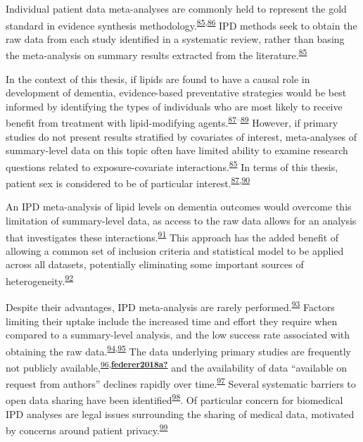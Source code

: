 \documentclass[a4paper, twoside]{templates/ociamthesis}
\begin{document}
Individual patient data meta-analyses are commonly held to represent the gold standard in evidence synthesis methodology.\textsuperscript{\protect\hyperlink{ref-riley2010}{85},\protect\hyperlink{ref-stewart1993}{86}} IPD methods seek to obtain the raw data from each study identified in a systematic review, rather than basing the meta-analysis on summary results extracted from the literature.\textsuperscript{\protect\hyperlink{ref-riley2010}{85}}

In the context of this thesis, if lipids are found to have a causal role in development of dementia, evidence-based preventative strategies would be best informed by identifying the types of individuals who are most likely to receive benefit from treatment with lipid-modifying agents.\textsuperscript{\protect\hyperlink{ref-arain2009}{87}--\protect\hyperlink{ref-mccartney2016}{89}} However, if primary studies do not present results stratified by covariates of interest, meta-analyses of summary-level data on this topic often have limited ability to examine research questions related to exposure-covariate interactions.\textsuperscript{\protect\hyperlink{ref-riley2010}{85}} In terms of this thesis, patient sex is considered to be of particular interest.\textsuperscript{\protect\hyperlink{ref-arain2009}{87},\protect\hyperlink{ref-letenneur1999}{90}}

An IPD meta-analysis of lipid levels on dementia outcomes would overcome this limitation of summary-level data, as access to the raw data allows for an analysis that investigates these interactions.\textsuperscript{\protect\hyperlink{ref-riley2020}{91}} This approach has the added benefit of allowing a common set of inclusion criteria and statistical model to be applied across all datasets, potentially eliminating some important sources of heterogeneity.\textsuperscript{\protect\hyperlink{ref-stewart2002}{92}}

Despite their advantages, IPD meta-analysis are rarely performed.\textsuperscript{\protect\hyperlink{ref-tugwell2010}{93}} Factors limiting their uptake include the increased time and effort they require when compared to a summary-level analysis, and the low success rate associated with obtaining the raw data.\textsuperscript{\protect\hyperlink{ref-nevitt2017a}{94},\protect\hyperlink{ref-ventresca2020}{95}} The data underlying primary studies are frequently not publicly available,\textsuperscript{\protect\hyperlink{ref-alsheikh-ali2011}{96},\protect\hyperlink{ref-federer2018a}{\textbf{federer2018a?}}} and the availability of data ``available on request from authors'' declines rapidly over time.\textsuperscript{\protect\hyperlink{ref-vines2014}{97}} Several systematic barriers to open data sharing have been identified\textsuperscript{\protect\hyperlink{ref-vanpanhuis2014}{98}}. Of particular concern for biomedical IPD analyses are legal issues surrounding the sharing of medical data, motivated by concerns around patient privacy.\textsuperscript{\protect\hyperlink{ref-wartenberg2010}{99}}
\end{document}
